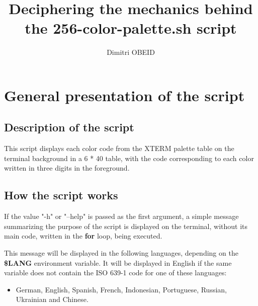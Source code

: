 \documentclass[a4paper,10pt]{article}
\title{\color{sec1}Deciphering the mechanics behind the \textbf{\color{sec2}256-color-palette.sh} script}\color{text}
\author{Dimitri OBEID}
\begin{document}
    \maketitle
    \newpage

    \hypertarget{contents}{}
    \tableofcontents
    \newpage

\color{sec1}
    \section{General presentation of the script}\color{text}

    \color{sec2}
    \subsection{Description of the script}\color{text}

    \begin{justify}
        This script displays each color code from the XTERM palette table on the terminal background in a 6 * 40 table, with the code corresponding to each color written in three digits in the foreground.
    \end{justify}




    \color{sec2}
    \subsection{How the script works}\color{text}

    \begin{justify}
        If the value "-h" or "--help" is passed as the first argument, a simple message summarizing the purpose of the script is displayed on the terminal, without its main code, written in the \textbf{\color{loop}for} loop, being executed.
    \end{justify}

    \begin{justify}
        This message will be displayed in the following languages, depending on the \textbf{\color{vars}\$LANG} environment variable. It will be displayed in English if the same variable does not contain the ISO 639-1 code for one of these languages:
    \end{justify}

    \begin{justify}
        \begin{itemize}
            \item German, English, Spanish, French, Indonesian, Portuguese, Russian, Ukrainian and Chinese.
        \end{itemize}

    \end{justify}
\end{document}

